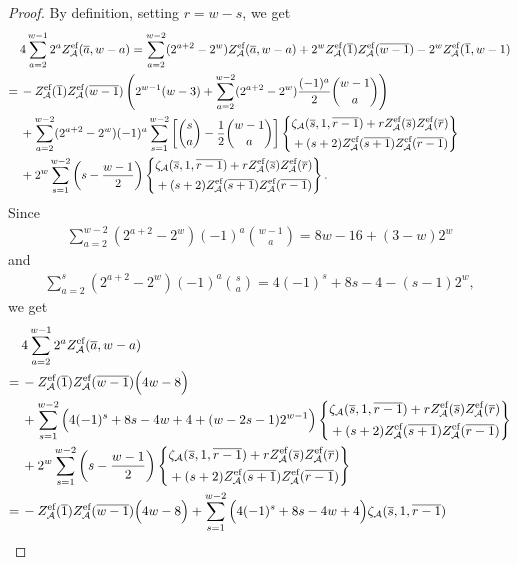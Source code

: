 \documentclass{article}
\newcommand{\calA}{\mathcal{A}}
\newcommand{\eff}{\text{\rm{ef}}}
\newcommand{\ol}{\overline}
\theoremstyle{plain}
\theoremstyle{definition}
\begin{document}
\begin{proof}
By definition, setting $r=w-s$, we get
\begin{align*}
&\,4\sum_{a=2}^{w-1} 2^a Z_\calA^\eff(\ol{a},w-a)=
\sum_{a=2}^{w-2} (2^{a+2}-2^w)  Z_\calA^\eff(\ol{a},w-a)+2^{w}Z_\calA^\eff(\ol{1})Z_\calA^\eff(\ol{w-1})  -2^w Z_\calA^\eff(\ol{1},w-1)\\
=&\, -Z_\calA^\eff(\ol{1})Z_\calA^\eff(\ol{w-1}) \left(2^{w-1}(w-3)+\sum_{a=2}^{w-2}(2^{a+2}-2^{w}) \frac{(-1)^a}2 \binom{w-1}{a}\right) \\
&\, + \sum_{a=2}^{w-2} (2^{a+2}-2^w) (-1)^a \sum_{s=1}^{w-2} \left[ \binom{s}{a}-\frac12\binom{w-1}{a}\right]
\left\{\aligned
&\zeta_\calA(\ol{s},1,\ol{r-1})+rZ_\calA^\eff(\ol{s})Z_\calA^\eff(\ol{r})\\
&+(s+2)Z_\calA^\eff(\ol{s+1})Z_\calA^\eff(\ol{r-1})
\endaligned \right\} \\
&\, +2^w\sum_{s=1}^{w-2} \left( s-\frac{w-1}2 \right)
\left\{\aligned
&\zeta_\calA(\ol{s},1,\ol{r-1})+rZ_\calA^\eff(\ol{s})Z_\calA^\eff(\ol{r})\\
&+(s+2)Z_\calA^\eff(\ol{s+1})Z_\calA^\eff(\ol{r-1})\endaligned \right\}.
\end{align*}
Since
\begin{align*}
\sum_{a=2}^{w-2} (2^{a+2}-2^{w})(-1)^a \binom{w-1}{a}= 8w-16+(3-w)2^w
\end{align*}
and
\begin{align*}
\sum_{a=2}^{s} (2^{a+2}-2^{w})(-1)^a \binom{s}{a}= 4(-1)^s+8s-4-(s-1)2^w,
\end{align*}
we get
\begin{align*}
&\,4\sum_{a=2}^{w-1} 2^a Z_\calA^\eff(\ol{a},w-a) \\
=&\, -Z_\calA^\eff(\ol{1})Z_\calA^\eff(\ol{w-1}) \Big(4w-8\Big) \\
&\, +   \sum_{s=1}^{w-2} \Big(4(-1)^s+8s-4w+4+(w-2s-1)2^{w-1} \Big)
\left\{\aligned
&\zeta_\calA(\ol{s},1,\ol{r-1})+rZ_\calA^\eff(\ol{s})Z_\calA^\eff(\ol{r})\\
&+(s+2)Z_\calA^\eff(\ol{s+1})Z_\calA^\eff(\ol{r-1})
\endaligned \right\} \\
&\, +2^w\sum_{s=1}^{w-2} \left( s-\frac{w-1}2 \right)
\left\{\aligned
&\zeta_\calA(\ol{s},1,\ol{r-1})+rZ_\calA^\eff(\ol{s})Z_\calA^\eff(\ol{r})\\
&+(s+2)Z_\calA^\eff(\ol{s+1})Z_\calA^\eff(\ol{r-1})\endaligned \right\}\\
=&\, -Z_\calA^\eff(\ol{1})Z_\calA^\eff(\ol{w-1}) \Big(4w-8\Big)
  +   \sum_{s=1}^{w-2} \Big(4(-1)^s+8s-4w+4 \Big)
\zeta_\calA(\ol{s},1,\ol{r-1}) \\

\end{align*}
\end{proof}
\end{document}

